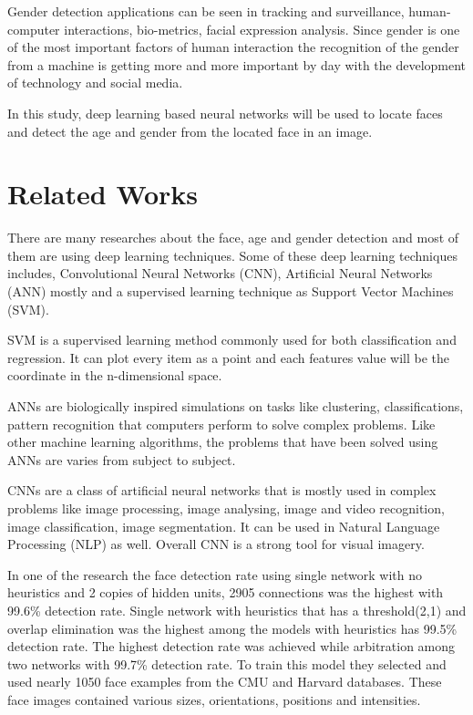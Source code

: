 \documentclass[conference]{IEEEtran}
\begin{document}
\bigskip

Gender detection applications can be seen in tracking and surveillance, human-computer interactions, bio-metrics, facial expression analysis. Since gender is one of the most important factors of human interaction the recognition of the gender from a machine is getting more and more important by day with the development of technology and social media.

\bigskip

In this study, deep learning based neural networks will be used to locate faces and detect the age and gender from the located face in an image.

\section{Related Works}

There are many researches about the face, age and gender detection and most of them are using deep learning techniques. Some of these deep learning techniques includes, Convolutional Neural Networks (CNN), Artificial Neural Networks (ANN) mostly and a supervised learning technique as Support Vector Machines (SVM). 
\bigskip

SVM is a supervised learning method commonly used for both classification and regression. It can plot every item as a point and each features value will be the coordinate in the n-dimensional space.

\bigskip
ANNs are biologically inspired simulations on tasks like clustering, classifications, pattern recognition that computers perform to solve complex problems. Like other machine learning algorithms, the problems that have been solved using ANNs are varies from subject to subject. 

\bigskip

CNNs are a class of artificial neural networks that is mostly used in complex problems like image processing, image analysing, image and video recognition, image classification, image segmentation. It can be used in Natural Language Processing (NLP) as well. Overall CNN is a strong tool for visual imagery.

\bigskip

In one of the research the face detection rate using single network with no heuristics and 2 copies of hidden units, 2905 connections was the highest with 99.6\% detection rate. Single network with heuristics that has a threshold(2,1) and overlap elimination was the highest among the models with heuristics has 99.5\% detection rate. The highest detection rate was achieved while arbitration among two networks with 99.7\% detection rate. To train this model they selected and used nearly 1050 face examples from the CMU and Harvard databases. These face images contained various sizes, orientations, positions and intensities. \cite{b1}
\end{document}
